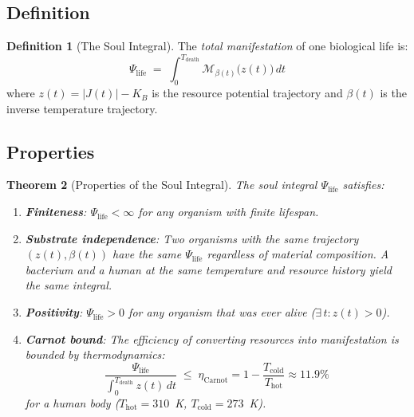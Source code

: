 \documentclass[12pt, letterpaper]{article}
\theoremstyle{plain}
\newtheorem{theorem}{Theorem}[section]
\theoremstyle{definition}
\newtheorem{definition}[theorem]{Definition}
\theoremstyle{remark}
\newcommand{\Mop}{\mathcal{M}}            %
\newcommand{\KB}{K_{\!B}}                 %
\newcommand{\soul}{\Psi_{\text{life}}}    %
\begin{document}
\subsection{Definition}

\begin{definition}[The Soul Integral]\label{def:soul}
  The \emph{total manifestation} of one biological life is:
  \begin{equation}\label{eq:soul}
    \boxed{\soul \;=\; \int_0^{T_{\text{death}}} \!\Mop_{\beta(t)}\!\bigl(z(t)\bigr)\, dt}
  \end{equation}
  where $z(t) = |J(t)| - \KB$ is the resource potential trajectory and $\beta(t)$ is the inverse temperature trajectory.
\end{definition}

\subsection{Properties}

\begin{theorem}[Properties of the Soul Integral]\label{thm:soul_properties}
  The soul integral $\soul$ satisfies:
  \begin{enumerate}[label=(\alph*)]
    \item \textbf{Finiteness}: $\soul < \infty$ for any organism with finite lifespan.
    \item \textbf{Substrate independence}: Two organisms with the same trajectory $(z(t), \beta(t))$ have the same $\soul$ regardless of material composition. A bacterium and a human at the same temperature and resource history yield the same integral.
    \item \textbf{Positivity}: $\soul > 0$ for any organism that was ever alive ($\exists\, t: z(t) > 0$).
    \item \textbf{Carnot bound}: The efficiency of converting resources into manifestation is bounded by thermodynamics:
    \begin{equation}\label{eq:carnot}
      \frac{\soul}{\int_0^{T_{\text{death}}} z(t)\,dt}
      \;\leq\; \eta_{\text{Carnot}}
      = 1 - \frac{T_{\text{cold}}}{T_{\text{hot}}}
      \approx 11.9\%
    \end{equation}
    for a human body ($T_{\text{hot}} = 310$~K, $T_{\text{cold}} = 273$~K).
  \end{enumerate}
\end{theorem}
\end{document}
